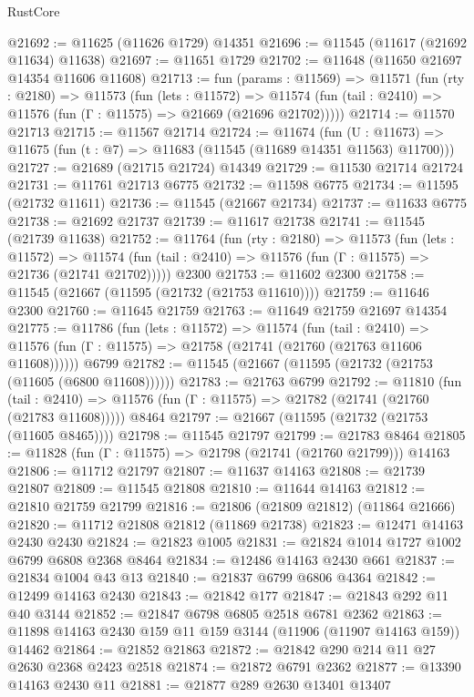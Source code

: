 \begin{lexlean}{RustCore}
\begin{coremodule}
@21692 := @11625 (@11626 @1729) @14351
@21696 := @11545 (@11617 (@21692 @11634) @11638)
@21697 := @11651 @1729
@21702 := @11648 (@11650 @21697 @14354 @11606 @11608)
@21713 := fun (params : @11569) =>
  @11571
    (fun (rty : @2180) =>
    @11573
      (fun (lets : @11572) =>
      @11574 (fun (tail : @2410) => @11576 (fun (Γ : @11575) => @21669 (@21696 @21702)))))
@21714 := @11570 @21713
@21715 := @11567 @21714
@21724 := @11674
    (fun (U : @11673) => @11675 (fun (t : @7) => @11683 (@11545 (@11689 @14351 @11563) @11700)))
@21727 := @21689 (@21715 @21724) @14349
@21729 := @11530 @21714 @21724
@21731 := @11761 @21713 @6775
@21732 := @11598 @6775
@21734 := @11595 (@21732 @11611)
@21736 := @11545 (@21667 @21734)
@21737 := @11633 @6775
@21738 := @21692 @21737
@21739 := @11617 @21738
@21741 := @11545 (@21739 @11638)
@21752 := @11764
    (fun (rty : @2180) =>
    @11573
      (fun (lets : @11572) =>
      @11574 (fun (tail : @2410) => @11576 (fun (Γ : @11575) => @21736 (@21741 @21702)))))
    @2300
@21753 := @11602 @2300
@21758 := @11545 (@21667 (@11595 (@21732 (@21753 @11610))))
@21759 := @11646 @2300
@21760 := @11645 @21759
@21763 := @11649 @21759 @21697 @14354
@21775 := @11786
    (fun (lets : @11572) =>
    @11574
      (fun (tail : @2410) =>
      @11576 (fun (Γ : @11575) => @21758 (@21741 (@21760 (@21763 @11606 @11608))))))
    @6799
@21782 := @11545 (@21667 (@11595 (@21732 (@21753 (@11605 (@6800 @11608))))))
@21783 := @21763 @6799
@21792 := @11810
    (fun (tail : @2410) => @11576 (fun (Γ : @11575) => @21782 (@21741 (@21760 (@21783 @11608)))))
    @8464
@21797 := @21667 (@11595 (@21732 (@21753 (@11605 @8465))))
@21798 := @11545 @21797
@21799 := @21783 @8464
@21805 := @11828 (fun (Γ : @11575) => @21798 (@21741 (@21760 @21799))) @14163
@21806 := @11712 @21797
@21807 := @11637 @14163
@21808 := @21739 @21807
@21809 := @11545 @21808
@21810 := @11644 @14163
@21812 := @21810 @21759 @21799
@21816 := @21806 (@21809 @21812) (@11864 @21666)
@21820 := @11712 @21808 @21812 (@11869 @21738)
@21823 := @12471 @14163 @2430 @2430
@21824 := @21823 @1005
@21831 := @21824 @1014 @1727 @1002 @6799 @6808 @2368 @8464
@21834 := @12486 @14163 @2430 @661
@21837 := @21834 @1004 @43 @13
@21840 := @21837 @6799 @6806 @4364
@21842 := @12499 @14163 @2430
@21843 := @21842 @177
@21847 := @21843 @292 @11 @40 @3144
@21852 := @21847 @6798 @6805 @2518 @6781 @2362
@21863 := @11898 @14163 @2430 @159 @11 @159 @3144 (@11906 (@11907 @14163 @159)) @14462
@21864 := @21852 @21863
@21872 := @21842 @290 @214 @11 @27 @2630 @2368 @2423 @2518
@21874 := @21872 @6791 @2362
@21877 := @13390 @14163 @2430 @11
@21881 := @21877 @289 @2630 @13401 @13407

\end{coremodule}
\end{lexlean}
